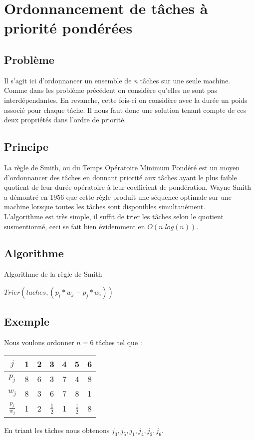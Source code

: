 \section{Ordonnancement de tâches à priorité pondérées}
\subsection{Problème}
Il s'agit ici d'ordonnancer un ensemble de {\em n} tâches sur une seule machine.
Comme dans les problème précédent on considère qu'elles ne sont pas
interdépendantes. En revanche, cette fois-ci on considère avec la durée un poids
associé pour chaque tâche. Il nous faut donc une solution tenant compte de ces
deux propriétés dans l'ordre de priorité. 
 
\subsection{Principe}
La règle de Smith, ou du Temps Opératoire Minimum Pondéré est un moyen 
d'ordonnancer des tâches en donnant priorité aux tâches ayant le plus faible 
quotient de leur durée opératoire à leur coefficient de pondération. Wayne Smith 
a démontré en 1956 que cette règle produit une séquence optimale sur une machine 
lorsque toutes les tâches sont disponibles simultanément.\\
L'algorithme est très simple, il suffit de trier les tâches selon le quotient 
susmentionné, ceci se fait bien évidemment en $O(n.log(n))$.

\subsection{Algorithme}
\begin{algorithm}
\caption{Algorithme de la règle de Smith}
\begin{algorithmic}
\STATE $Trier(taches, (p_i*w_j - p_j*w_i))$
\end{algorithmic}
\end{algorithm}

\subsection{Exemple}
Nous voulons ordonner $n = 6$ tâches tel que :
\begin{center}
\begin{tabular}{|c|c|c|c|c|c|c|}
\hline
$j$ & 1 & 2 & 3 & 4 & 5 & 6  \\
\hline
$p_j$ & 8 & 6 & 3 & 7 & 4 & 8  \\
$w_j$ & 8 & 3 & 6 & 7 & 8 & 1  \\
\hline
$\frac{p_j}{w_j}$ & 1 & 2 & $\frac{1}{2}$ & 1 & $\frac{1}{2}$ & 8 \\
\hline
\end{tabular}
\end{center}
En triant les tâches nous obtenons $j_3,j_5,j_1,j_4,j_2,j_6$.

